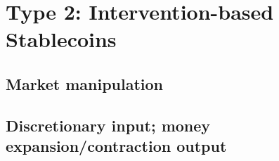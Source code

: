 \section{Type 2: Intervention-based Stablecoins}
\label{sec:t2}




\subsection{Market manipulation}






\subsection{Discretionary input; money expansion/contraction output}

